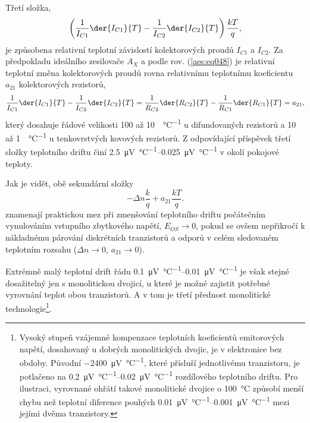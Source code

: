         Třetí složka,
        \begin{equation*}
          \left(\dfrac{1}{I_{C1}}\der{I_{C1}}{T} - \dfrac{1}{I_{C2}}\der{I_{C2}}{T}
          \right)\dfrac{kT}{q},
        \end{equation*} 
        je způsobena relativní teplotní závislostí kolektorových proudů \(I_{C1}\) a \(I_{C2}\). Za
        předpokladu ideálního zesilovače \(A_X\) a podle rov. (\ref{aes:eq048}) je relativní
        teplotní změna kolektorových proudů rovna relativnímu teplotnímu koeficientu \(a_{21}\)
        kolektorových rezistorů,
        \begin{equation*}
          \dfrac{1}{I_{C1}}\der{I_{C1}}{T} - \dfrac{1}{I_{C2}}\der{I_{C2}}{T} = 
          \dfrac{1}{R_{C2}}\der{R_{C2}}{T} - \dfrac{1}{R_{C1}}\der{R_{C1}}{T} = a_{21},
        \end{equation*} 
        který dosahuje řádové velikosti \num{100} až \qty{10}{\ppm\per\degreeCelsius} u difundovaných
        rezistorů a 10 až \SI[per-mode = symbol]{1}{\ppm\per\degreeCelsius} u tenkovrstvých kovových
        rezistorů. Z odpovídající příspěvek třetí složky teplotního driftu činí \SIrange[per-mode =
        symbol]{2.5}{0.025}{\uV\per\degreeCelsius} v okolí pokojové teploty.

        Jak je vidět, obě sekundární složky
        \begin{equation}\label{aes:eq060}
          - \Delta n\dfrac{k}{q} + a_{21}\dfrac{kT}{q}.
        \end{equation} 
        znamenají praktickou mez při zmenšování teplotního driftu počátečním vynulováním vstupního
        zbytkového napětí, \(E_{OS}\rightarrow0\), pokud se ovšem nepřikročí k nákladnému párování
        diskrétních tranzistorů a odporů v celém sledovaném teplotním rozsahu (\(\Delta
        n\rightarrow0\), \(a_{21}\rightarrow0\)).

        Extrémně malý teplotní drift řádu \SIrange{0.1}{0.01}{\uV\per\degreeCelsius} je však stejné
        dosažitelný jen s monolitickou dvojicí, u které je možné zajistit potřebné vyrovnání teplot
        obou tranzistorů. A v tom je třetí přednost monolitické technologie\footnote{Vysoký stupeň
        vzájemné kompenzace teplotních koeficientů emitorových napětí, dosahovaný u dobrých
        monolitických dvojic, je v elektronice bez obdoby. Původní
        \qty{-2400}{\uV\per\degreeCelsius}, které přísluší jednotlivému tranzistoru, je potlačeno na
        \SIrange{0.2}{0.02}{\uV\per\degreeCelsius} rozdílového teplotního driftu. Pro ilustraci,
        vyrovnané ohřátí takové monolitické dvojice o \qty{100}{\degreeCelsius} způsobí menší chybu
        než teplotní diference pouhých \SIrange{0.01}{0.001}{\uV\per\degreeCelsius}  mezi jejími
        dvěma tranzistory.}.

